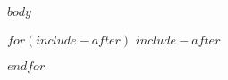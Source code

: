 \documentclass[12pt,article,oneside]{memoir}
\begin{document}
%


$body$


$for(include-after)$
$include-after$

$endfor$
\end{document}
